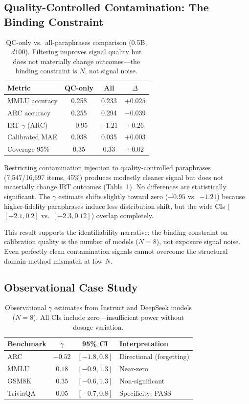 \documentclass[11pt,a4paper]{article}
\begin{document}
\subsection{Quality-Controlled Contamination: The Binding Constraint}

\begin{table}[t]
\centering
\small
\caption{QC-only vs.\ all-paraphrases comparison (0.5B, $d100$). Filtering improves signal quality but does not materially change outcomes---the binding constraint is $N$, not signal noise.}
\label{tab:qc}
\begin{tabular}{lccc}
\toprule
Metric & QC-only & All & $\Delta$ \\
\midrule
MMLU accuracy & 0.258 & 0.233 & $+0.025$ \\
ARC accuracy & 0.255 & 0.294 & $-0.039$ \\
IRT $\gamma$ (ARC) & $-0.95$ & $-1.21$ & $+0.26$ \\
Calibrated MAE & 0.038 & 0.035 & $+0.003$ \\
Coverage 95\% & 0.35 & 0.33 & $+0.02$ \\
\bottomrule
\end{tabular}
\end{table}

Restricting contamination injection to quality-controlled paraphrases (7,547/16,697 items, 45\%) produces modestly cleaner signal but does not materially change IRT outcomes (Table~\ref{tab:qc}). No differences are statistically significant. The $\gamma$ estimate shifts slightly toward zero ($-0.95$ vs.\ $-1.21$) because higher-fidelity paraphrases induce less distribution shift, but the wide CIs ($[-2.1, 0.2]$ vs.\ $[-2.3, 0.12]$) overlap completely.

This result supports the identifiability narrative: the binding constraint on calibration quality is the number of models ($N = 8$), not exposure signal noise. Even perfectly clean contamination signals cannot overcome the structural domain-method mismatch at low $N$.

\subsection{Observational Case Study}

\begin{table}[t]
\centering
\small
\caption{Observational $\gamma$ estimates from Instruct and DeepSeek models ($N = 8$). All CIs include zero---insufficient power without dosage variation.}
\label{tab:observational}
\begin{tabular}{lccl}
\toprule
Benchmark & $\gamma$ & 95\% CI & Interpretation \\
\midrule
ARC & $-0.52$ & $[-1.8, 0.8]$ & Directional (forgetting) \\
MMLU & $0.18$ & $[-0.9, 1.3]$ & Near-zero \\
GSM8K & $0.35$ & $[-0.6, 1.3]$ & Non-significant \\
TriviaQA & $0.05$ & $[-0.7, 0.8]$ & Specificity: PASS \\
\bottomrule
\end{tabular}
\end{table}
\end{document}
